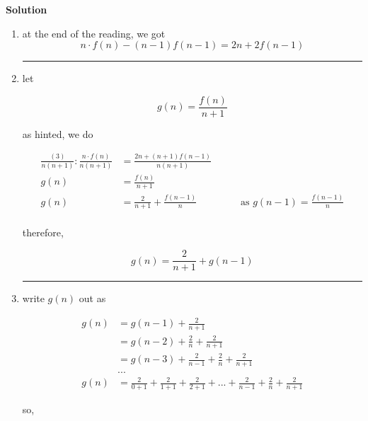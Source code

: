 \documentclass{article}
\newcommand{\solution}{\textbf{\large Solution}}
\theoremstyle{remark}
\begin{document}
\medskip
\solution

\begin{enumerate}[label=(\roman*)]
    \item at the end of the reading, we got
        \begin{equation}
            n \cdot f(n) - (n-1)f(n-1) = 2n + 2f(n-1)
        \tag{3}
        \end{equation}

    \medskip
    \begin{center}
    \rule{0.3\linewidth}{0.2pt}
    \end{center}
    \medskip

    \item let

        \[g(n) = \frac{f(n)}{n+1}\]

        as hinted, we do 

        \begin{align*}
            \frac{(3)}{n(n+1)}: \frac{n \cdot f(n)}{n(n+1)} &= \frac{2n+(n+1)f(n-1)}{n(n+1)} \\
            g(n) &= \frac{f(n)}{n+1} \\
            g(n) &= \frac{2}{n+1} + \frac{f(n-1)}{n} && \quad \text{ as } g(n-1) = \frac{f(n-1)}{n}\\
        \end{align*}

        therefore, 

        \[            
            \boxed{g(n) = \frac{2}{n+1} + g(n-1)}
        \]


    \medskip
    \begin{center}
    \rule{0.3\linewidth}{0.2pt}
    \end{center}
    \medskip

    \item write $g(n)$ out as

        \begin{align*}
            g(n) &= g(n-1) + \frac{2}{n+1} \\
            &= g(n-2) + \frac{2}{n} + \frac{2}{n+1} \\
            &= g(n-3) + \frac{2}{n-1} + \frac{2}{n} + \frac{2}{n+1} \\
            &... \\
            g(n) &= \frac{2}{0+1} + \frac{2}{1+1} + \frac{2}{2+1} + ... + \frac{2}{n-1} + \frac{2}{n} + \frac{2}{n+1}
        \end{align*}

        so, 


\end{enumerate}
\end{document}
